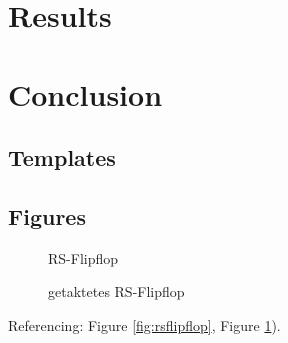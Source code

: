 \documentclass[12pt, a4paper, onepage, english,singlespacing, parskip]{scrartcl}
\begin{document}
\section{Results}
\section{Conclusion}



\clearpage

\begin{appendices}

\section{Templates}
\subsection{Figures}
\begin{figure}[h!]
\centering
    \caption{RS-Flipflop}%
    \label{fig:rsflipflop}
  \endminipage\hspace{1cm}   
%
    \caption{getaktetes RS-Flipflop}%
    \label{fig:rsflipfloptakt}
  \endminipage
\end{figure}

Referencing: Figure \ref{fig:rsflipflop}, Figure \ref{fig:rsflipfloptakt}).




\end{appendices}
\end{document}
